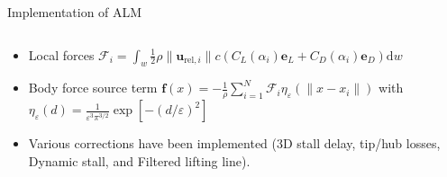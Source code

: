 \documentclass[10pt]{beamer}
\begin{document}
\begin{frame}{Implementation of ALM}
\begin{columns}
\begin{column}{0.90\textwidth}
\begin{itemize}
\begin{itemize}
\justifying
\item[\ding{212}] Local forces $\mathcal{F}_i=\int_w\frac12\rho\|\mathbf{u}_{\text{rel},i}\|c\left(C_L(\alpha_i)\mathbf{e}_L+C_D(\alpha_i)\mathbf{e}_D\right)\mathrm{d}w$
\item[\ding{212}] Body force source term $\mathbf{f}(x)=-\frac{1}{\rho}\sum_{i=1}^{N}\mathcal{F}_i\eta_{\varepsilon}\left(\|x-x_i\|\right)$ with $\eta_\varepsilon(d)=\frac{1}{\varepsilon^3\pi^{3/2}}\exp\left[-(d/\varepsilon)^2\right]$
\item[\ding{212}] Various corrections have been implemented (3D stall delay, tip/hub losses, Dynamic stall, and Filtered lifting line).
\end{itemize}
\end{itemize}
\end{column}
\begin{column}{0.20\textwidth}
\end{column}
\end{columns}
\end{frame}
\end{document}
